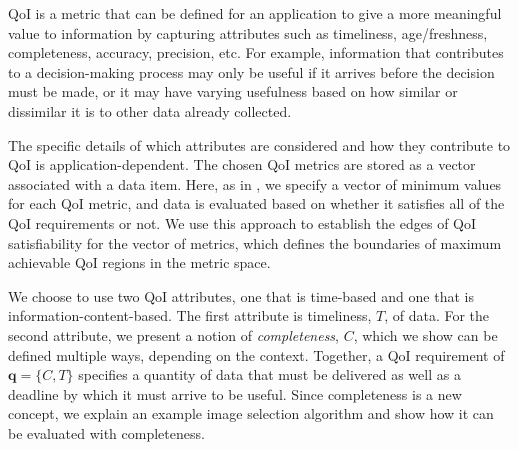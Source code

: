 %        

QoI is a metric that can be defined for an application to give a more meaningful value to information by capturing attributes such as  timeliness, age/freshness, completeness, accuracy, precision, etc.  
For example, information that contributes to a decision-making process may only be useful if it arrives before the decision must be made, or it may have varying usefulness based on how similar or dissimilar it is to other data already collected.

The specific details of which attributes are considered and how they contribute to QoI is application-dependent.  The chosen QoI metrics are stored as a vector associated with a data item.  
Here, as in \cite{qoi_aware_tactical_mil_nets}, we specify a vector of minimum values for each QoI metric, and data is evaluated based on whether it satisfies all of the QoI requirements or not.  We use this approach to establish the edges of QoI satisfiability for the vector of metrics, which defines the boundaries of maximum achievable QoI regions in the metric space.

We choose to use two QoI attributes, one that is time-based and one that is information-content-based.  The first attribute is timeliness, $T$, of data.  For the second attribute, we present a notion of \emph{completeness}, $C$, which we show can be defined multiple ways, depending on the context.  Together, a QoI requirement of $\mathbf{q} = \{C,T\}$ specifies a quantity of data that must be delivered as well as a deadline by which it must arrive to be useful.  Since completeness is a new concept, we explain an example image selection algorithm and show how it can be evaluated with completeness.

